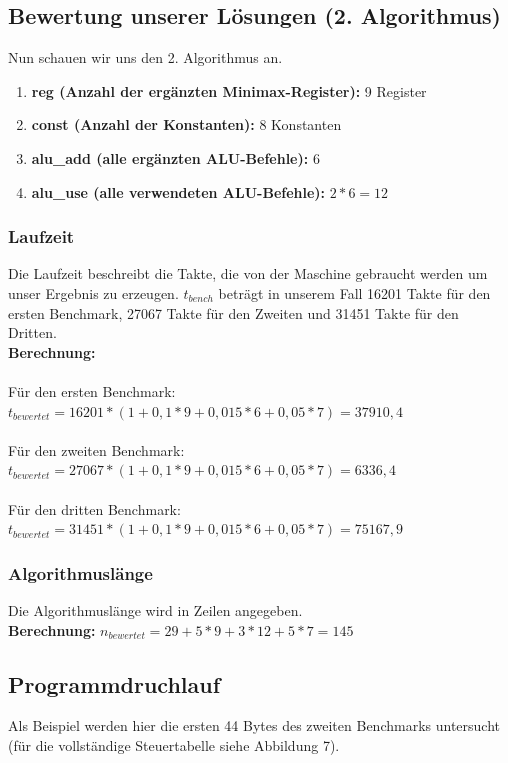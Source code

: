 \documentclass[12pt,titlepage]{article}
\begin{document}
\newpage

\subsection{Bewertung unserer Lösungen (2. Algorithmus)}

Nun schauen wir uns den 2. Algorithmus an.

\begin{enumerate}
\item \textbf{reg (Anzahl der ergänzten Minimax-Register): } 9 Register
\item \textbf{const (Anzahl der Konstanten): } 8 Konstanten
\item \textbf{alu\_add (alle erg{\"a}nzten ALU-Befehle):} 6
\item \textbf{alu\_use (alle verwendeten ALU-Befehle):} $2*6=12$
\end{enumerate}

\subsubsection{Laufzeit}
Die Laufzeit beschreibt die Takte, die von der Maschine gebraucht werden um unser Ergebnis zu erzeugen. $t_{bench}$ beträgt in unserem Fall 16201 Takte für den ersten Benchmark, 27067 Takte für den Zweiten und 31451 Takte für den Dritten.\\

\textbf{Berechnung:}\\\\
Für den ersten Benchmark: $t_{bewertet} = 16201 * (1 + 0,1*9 + 0,015*6 + 0,05 * 7) = 37910,4$\\\\
Für den zweiten Benchmark: $t_{bewertet} = 27067 * (1 + 0,1*9 + 0,015*6 + 0,05 * 7) = 6336,4$\\\\
Für den dritten Benchmark: $t_{bewertet} = 31451 * (1 + 0,1*9 + 0,015*6 + 0,05 * 7) = 75167,9$\\

\subsubsection{Algorithmuslänge}
Die Algorithmuslänge wird in Zeilen angegeben.\\

\textbf{Berechnung:} $n_{bewertet} = 29 + 5*9 + 3*12 + 5*7 = 145$


\newpage

\subsection{Programmdruchlauf}
Als Beispiel werden hier die ersten 44 Bytes des zweiten Benchmarks untersucht (für die vollständige Steuertabelle siehe Abbildung 7).
\end{document}
